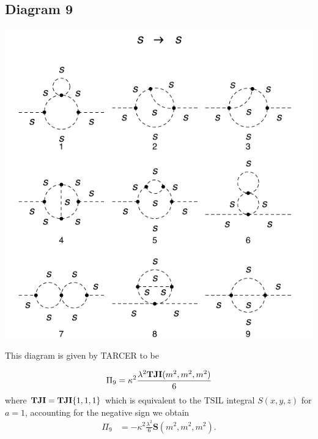 \documentclass[11pt]{article}
\newcommand{\tsil}{\textsf{TSIL} }
\newcommand{\tarcer}{\textsf{TARCER} }
\begin{document}
\subsection*{Diagram 9}
\noindent\begin{minipage}{0.3\textwidth}
\begin{center}
\includegraphics{2loop_9.pdf}
\end{center}
\end{minipage}
\noindent\begin{minipage}{0.7\textwidth}
This diagram is given by \tarcer to be

 \begin{align}
 \Pi_9 =\kappa^2 \frac{\lambda^2 {\tt{\mathbf{TJI}}}(m^2,m^2,m^2) }{6}
 \end{align}
 where ${\tt{\mathbf{TJI}}} = {\tt{\mathbf{TJI}}}\{1,1,1\}$ which is equivalent to the \tsil integral $S(x,y,z)$ for $a=1$, accounting for the negative sign we obtain
 \begin{align*}
 \Pi_9 & = -\kappa^2\frac{\lambda^2}{6}\textbf{S}(m^2,m^2,m^2).
 \end{align*}
 \end{minipage}
 
\end{document}
